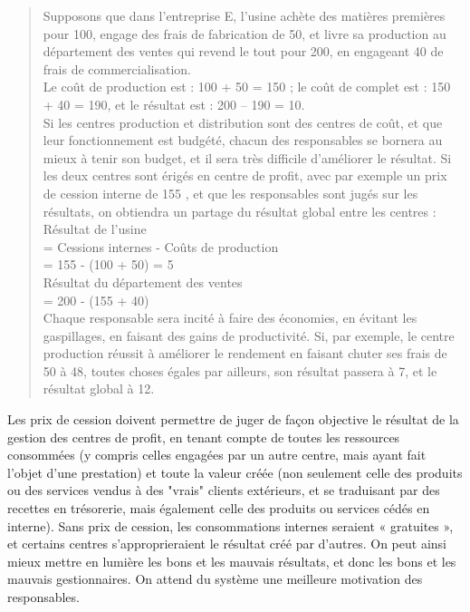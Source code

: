 \documentclass{tufte-handout}
\begin{document}
\begin{verse}
Supposons que dans l’entreprise E, l'usine achète des matières premières pour 100, engage des frais de fabrication de 50, et livre sa production au département des ventes qui revend le tout pour 200, en engageant 40 de frais de commercialisation.\\
Le coût de production est : 100 + 50 = 150 ; le coût de complet est : 150 + 40 = 190, et le résultat est : 200 – 190 = 10.\\
Si les centres production et distribution sont des centres de coût, et que leur fonctionnement est budgété, chacun des responsables se bornera au mieux à tenir son budget, et il sera très difficile d’améliorer le résultat. Si les deux centres sont érigés en centre de profit, avec par exemple un prix de cession interne de 155 , et que les responsables sont jugés sur les résultats, on obtiendra un partage du résultat global entre les centres :\\
Résultat de l'usine\\
= Cessions internes - Coûts de production\\
= 155 - (100 + 50) = 5\\
Résultat du département des ventes\\
= 200 - (155 + 40)\\
Chaque responsable sera incité à faire des économies, en évitant les gaspillages, en faisant des gains de productivité. Si, par exemple, le centre production réussit à améliorer le rendement en faisant chuter ses frais de 50 à 48, toutes choses égales par ailleurs, son résultat passera à 7, et le résultat global à 12.\\
\end{verse}

Les prix de cession doivent permettre de juger de façon objective le résultat de la gestion des centres de profit, en tenant compte de toutes les ressources consommées (y compris celles engagées par un autre centre, mais ayant fait l’objet d’une prestation) et toute la valeur créée (non seulement celle des produits ou des services vendus à des "vrais" clients extérieurs, et se traduisant par des recettes en trésorerie, mais également celle des produits ou services cédés en interne). Sans prix de cession, les consommations internes seraient « gratuites », et certains centres s’approprieraient le résultat créé par d’autres. On peut ainsi mieux mettre en lumière les bons et les mauvais résultats, et donc les bons et les mauvais gestionnaires. On attend du système une meilleure motivation des responsables.\\
\end{document}
